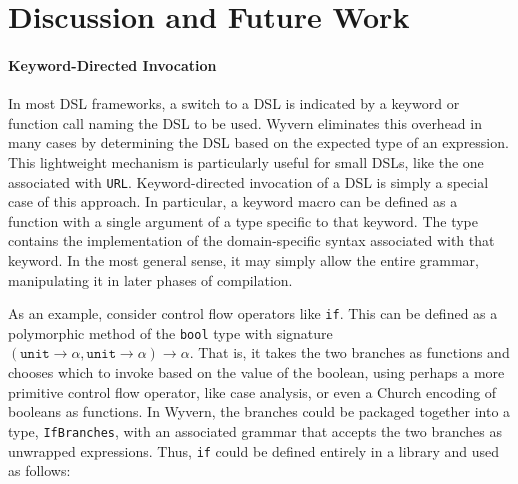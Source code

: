 





\newpage

\section{Discussion and Future Work}\label{s:discussion}
\paragraph{Keyword-Directed Invocation}
In most DSL frameworks, a switch to a DSL is indicated by a keyword or function call naming the DSL to be used. Wyvern eliminates this overhead in many cases by determining the DSL based on the expected type of an expression. This lightweight mechanism is particularly useful for small DSLs, like the one associated with \lstinline{URL}. Keyword-directed invocation of a DSL is simply a special case of this approach. In particular, a keyword macro can be defined as a function with a single argument of a type specific to that keyword. The type contains the implementation of the domain-specific syntax associated with that keyword. In the most general sense, it may simply allow the entire  grammar, manipulating it in later phases of compilation. 

As an example, consider control flow operators like \verb|if|. This can be defined as a polymorphic method of the \verb|bool| type with signature $(\texttt{unit} \rightarrow \alpha, \texttt{unit} \rightarrow \alpha) \rightarrow \alpha$. That is, it takes the two branches as functions and chooses which to invoke based on the value of the boolean, using perhaps a more primitive control flow operator, like case analysis, or even a Church encoding of booleans as functions. In Wyvern, the branches could be packaged together into a type, \verb|IfBranches|, with an associated grammar that accepts the two branches as unwrapped expressions. Thus, \verb|if| could be defined entirely in a library and used as follows: 

